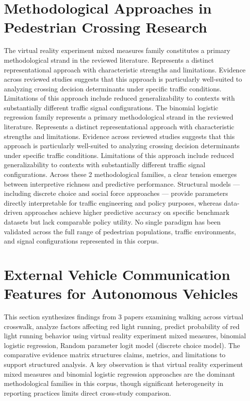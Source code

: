 \documentclass{article}
\begin{document}
\section{Methodological Approaches in Pedestrian Crossing Research}
The virtual reality experiment mixed measures family constitutes a primary methodological strand in the reviewed literature. Represents a distinct representational approach with characteristic strengths and limitations. Evidence across reviewed studies suggests that this approach is particularly well-suited to analyzing crossing decision determinants under specific traffic conditions. Limitations of this approach include reduced generalizability to contexts with substantially different traffic signal configurations. The binomial logistic regression family represents a primary methodological strand in the reviewed literature. Represents a distinct representational approach with characteristic strengths and limitations. Evidence across reviewed studies suggests that this approach is particularly well-suited to analyzing crossing decision determinants under specific traffic conditions. Limitations of this approach include reduced generalizability to contexts with substantially different traffic signal configurations. Across these 2 methodological families, a clear tension emerges between interpretive richness and predictive performance. Structural models — including discrete choice and social force approaches — provide parameters directly interpretable for traffic engineering and policy purposes, whereas data-driven approaches achieve higher predictive accuracy on specific benchmark datasets but lack comparable policy utility. No single paradigm has been validated across the full range of pedestrian populations, traffic environments, and signal configurations represented in this corpus.

\section{External Vehicle Communication Features for Autonomous Vehicles}
This section synthesizes findings from 3 papers examining walking across virtual crosswalk, analyze factors affecting red light running, predict probability of red light running behavior using virtual reality experiment mixed measures, binomial logistic regression, Random parameter logit model (discrete choice model). The comparative evidence matrix structures claims, metrics, and limitations to support structured analysis. A key observation is that virtual reality experiment mixed measures and binomial logistic regression approaches are the dominant methodological families in this corpus, though significant heterogeneity in reporting practices limits direct cross-study comparison.
\end{document}
